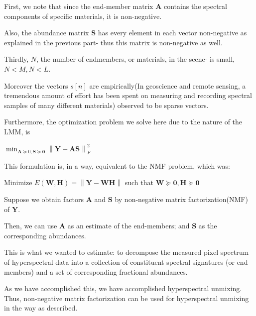 \documentclass[fleqn, 11pt]{article}
\newcommand{\bs}[1]{\boldsymbol{#1}}
\newcommand\norm[1]{\left\lVert#1\right\rVert}
\begin{document}
First, we note that since the end-member matrix $\bs{A}$ 
contains the spectral components of specific materials, it is non-negative. 

\smallskip

Also, the abundance matrix $\bs{S}$ has every element in each vector non-negative 
as explained in the previous part- thus this matrix is non-negative as well. 

\smallskip

Thirdly, $N$, the number of endmembers, or materials, in the scene- is small, $N < M, N<L$.

\smallskip

Moreover the vectors $s[n]$ are empirically(In geoscience and remote sensing,
a tremendous amount of effort has been spent on measuring
and recording spectral samples of many different materials) observed to be sparse vectors. 


\smallskip

Furthermore, the optimization problem we solve here due to the nature of the LMM, is 

\begin{center}
    $\displaystyle \min_{ \bs{A} \succeq {0}, \bs{S \succeq 0}  } \norm{\bs{Y-AS}}^2_F$
\end{center}

This formulation is, in a way,  equivalent to the NMF problem, which was:

\begin{center}
    Minimize $E(\bs{W, H}) = \norm{\bs{Y-WH}}  $ such that $\bs{W} \succeq \bs{0}, \bs{H} \succeq \bs{0} $
\end{center}

Suppose we obtain factors $\bs{A}$
and $\bs{S}$ by non-negative matrix factorization(NMF) of $\bs{Y}$.

\smallskip

Then, we can use  $\bs{A}$ as an estimate of the end-members; and $\bs{S}$ as the corresponding abundances.

\smallskip

This is what we wanted to estimate: to decompose the measured pixel spectrum
of hyperspectral data into a collection of constituent spectral
signatures (or end-members) and a set of corresponding fractional abundances.

\smallskip

As we have accomplished this, we have accomplished hyperspectral unmixing.
Thus, non-negative matrix factorization can be used for hyperspectral
unmixing in the way as described. 
\end{document}
